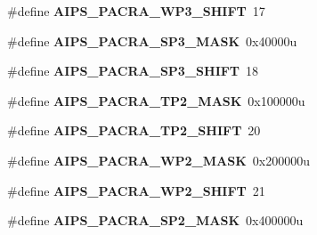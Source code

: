 \begin{DoxyCompactItemize}
\item 
\#define {\bfseries A\+I\+P\+S\+\_\+\+P\+A\+C\+R\+A\+\_\+\+W\+P3\+\_\+\+S\+H\+I\+FT}~17\hypertarget{group__AIPS__Register__Masks_gaf798c800e9dbba0c812c86d8c4f165d0}{}\label{group__AIPS__Register__Masks_gaf798c800e9dbba0c812c86d8c4f165d0}

\item 
\#define {\bfseries A\+I\+P\+S\+\_\+\+P\+A\+C\+R\+A\+\_\+\+S\+P3\+\_\+\+M\+A\+SK}~0x40000u\hypertarget{group__AIPS__Register__Masks_ga0fa53b5d74048bbe0e9ca25c39acc721}{}\label{group__AIPS__Register__Masks_ga0fa53b5d74048bbe0e9ca25c39acc721}

\item 
\#define {\bfseries A\+I\+P\+S\+\_\+\+P\+A\+C\+R\+A\+\_\+\+S\+P3\+\_\+\+S\+H\+I\+FT}~18\hypertarget{group__AIPS__Register__Masks_gaf22a5f77a5c7e0e4718abf3686305d6e}{}\label{group__AIPS__Register__Masks_gaf22a5f77a5c7e0e4718abf3686305d6e}

\item 
\#define {\bfseries A\+I\+P\+S\+\_\+\+P\+A\+C\+R\+A\+\_\+\+T\+P2\+\_\+\+M\+A\+SK}~0x100000u\hypertarget{group__AIPS__Register__Masks_ga9f095d0133106d934d6539734fb4e0bb}{}\label{group__AIPS__Register__Masks_ga9f095d0133106d934d6539734fb4e0bb}

\item 
\#define {\bfseries A\+I\+P\+S\+\_\+\+P\+A\+C\+R\+A\+\_\+\+T\+P2\+\_\+\+S\+H\+I\+FT}~20\hypertarget{group__AIPS__Register__Masks_gad59367457d6e0c16362d23b9c09f416b}{}\label{group__AIPS__Register__Masks_gad59367457d6e0c16362d23b9c09f416b}

\item 
\#define {\bfseries A\+I\+P\+S\+\_\+\+P\+A\+C\+R\+A\+\_\+\+W\+P2\+\_\+\+M\+A\+SK}~0x200000u\hypertarget{group__AIPS__Register__Masks_gafb7aafc6a1e9590a2ab3ca9444a6858e}{}\label{group__AIPS__Register__Masks_gafb7aafc6a1e9590a2ab3ca9444a6858e}

\item 
\#define {\bfseries A\+I\+P\+S\+\_\+\+P\+A\+C\+R\+A\+\_\+\+W\+P2\+\_\+\+S\+H\+I\+FT}~21\hypertarget{group__AIPS__Register__Masks_ga667bbec8a03882a449090df9e783e134}{}\label{group__AIPS__Register__Masks_ga667bbec8a03882a449090df9e783e134}

\item 
\#define {\bfseries A\+I\+P\+S\+\_\+\+P\+A\+C\+R\+A\+\_\+\+S\+P2\+\_\+\+M\+A\+SK}~0x400000u\hypertarget{group__AIPS__Register__Masks_ga8f13bf1feebb8678421318b1d6dca781}{}\label{group__AIPS__Register__Masks_ga8f13bf1feebb8678421318b1d6dca781}


\end{DoxyCompactItemize}
